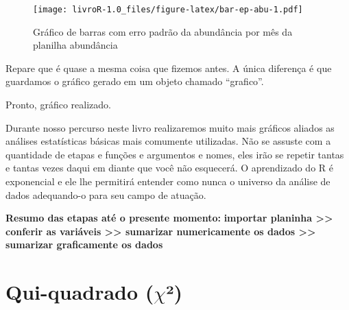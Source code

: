 \documentclass[titlepage, oneside, openany, a4paper]{book}
\newenvironment{Shaded}{\begin{snugshade}}{\end{snugshade}}
\newcommand{\DataTypeTok}[1]{\textcolor[rgb]{0.13,0.29,0.53}{#1}}
\newcommand{\DecValTok}[1]{\textcolor[rgb]{0.00,0.00,0.81}{#1}}
\newcommand{\KeywordTok}[1]{\textcolor[rgb]{0.13,0.29,0.53}{\textbf{#1}}}
\newcommand{\NormalTok}[1]{#1}
\newcommand{\OperatorTok}[1]{\textcolor[rgb]{0.81,0.36,0.00}{\textbf{#1}}}
\newcommand{\StringTok}[1]{\textcolor[rgb]{0.31,0.60,0.02}{#1}}
\begin{document}
\begin{Shaded}
\end{Shaded}

\begin{figure}
\centering
\texttt{[image: livroR-1.0\_files/figure-latex/bar-ep-abu-1.pdf]}
\caption{\label{fig:bar-ep-abu}Gráfico de barras com erro padrão da abundância por mês da planilha abundância}
\end{figure}

Repare que é quase a mesma coisa que fizemos antes. A única diferença é que guardamos o gráfico gerado em um objeto chamado ``grafico''.

Pronto, gráfico realizado.

Durante nosso percurso neste livro realizaremos muito mais gráficos aliados as análises estatísticas básicas mais comumente utilizadas. Não se assuste com a quantidade de etapas e funções e argumentos e nomes, eles irão se repetir tantas e tantas vezes daqui em diante que você não esquecerá. O aprendizado do R é exponencial e ele lhe permitirá entender como nunca o universo da análise de dados adequando-o para seu campo de atuação.

\textbf{Resumo das etapas até o presente momento:}
\textbf{importar planinha \textgreater{}\textgreater{} conferir as variáveis \textgreater{}\textgreater{} sumarizar numericamente os dados \textgreater{}\textgreater{} sumarizar graficamente os dados}

\hypertarget{qui-quadrado-chi}{%
\chapter{\texorpdfstring{Qui-quadrado (\(\chi\)²)}{Qui-quadrado (\textbackslash{}chi²)}}\label{qui-quadrado-chi}}
\end{document}
